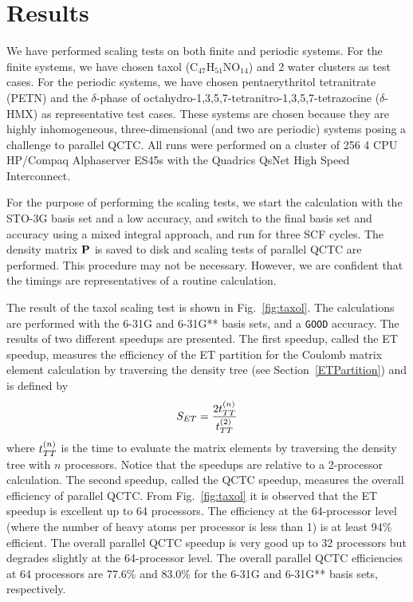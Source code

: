 \commentoutA{\documentclass[prl,aps,twocolumn,twocolumngrid,superbib]{revtex4}}
\begin{document}
\section{Results}
\label{results}
We have performed scaling tests on both finite and periodic
systems. For the finite systems, we have chosen taxol
(C$_{47}$H$_{51}$NO$_{14}$) and 2 water clusters as test cases. For
the periodic systems, we have chosen pentaerythritol tetranitrate
(PETN)\cite{CGan04A} and the $\delta$-phase of
octahydro-1,3,5,7-tetranitro-1,3,5,7-tetrazocine
($\delta$-HMX)\cite{JPLewis00} as representative test cases. These
systems are chosen because they are highly inhomogeneous,
three-dimensional (and two are periodic) systems posing a challenge to
parallel QCTC. All runs were performed on a cluster of 256 4 CPU
HP/Compaq Alphaserver ES45s with the Quadrics QsNet High Speed
Interconnect.

For the purpose of performing the scaling tests, we start the
calculation with the STO-3G basis set and a low accuracy, and switch
to the final basis set and accuracy using a mixed integral approach,
and run for three SCF cycles. The density matrix ${\bf P}$ is saved to
disk and scaling tests of parallel QCTC are performed. This procedure
may not be necessary. However, we are confident that the timings are
representatives of a routine calculation.

The result of the taxol scaling test is shown in Fig.~\ref{fig:taxol}.
The calculations are performed with the 6-31G and 6-31G** basis sets,
and a {\tt GOOD} accuracy\cite{CTymczak04a}.  The results of two
different speedups are presented.  The first speedup, called the ET
speedup, measures the efficiency of the ET partition for the Coulomb
matrix element calculation by traversing the density tree (see
Section~\ref{ETPartition}) and is defined by
\begin{equation}
S_{ET} = \frac{2t_{TT}^{(n)}}{t_{TT}^{(2)}}
\end{equation}
where $t_{TT}^{(n)}$ is the time to evaluate the matrix elements by
traversing the density tree with $n$ processors. Notice that the
speedups are relative to a 2-processor calculation.  The second
speedup, called the QCTC speedup, measures the overall efficiency of
parallel QCTC.  From Fig.~\ref{fig:taxol} it is observed that the ET
speedup is excellent up to 64 processors. The efficiency at the
64-processor level (where the number of heavy atoms per processor is
less than 1) is at least 94\% efficient.
The overall parallel QCTC speedup is very good up to 32 processors but
degrades slightly at the 64-processor level.  The overall parallel
QCTC efficiencies at 64 processors are
77.6\% and 83.0\% for the 6-31G and 6-31G** basis sets, respectively.
\end{document}
